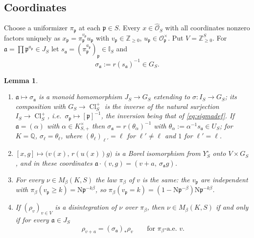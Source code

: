 \documentclass[11pt]{amsart}
\numberwithin{equation}{section}
\newtheorem{lemma}[theorem]{Lemma}
\theoremstyle{definition}
\theoremstyle{remark}
\newcommand{\Z}{\mathbb{Z}}
\newcommand{\Q}{\mathbb{Q}}
\newcommand{\Cl}{\operatorname{Cl}}
\newcommand{\Ns}{\mathrm{N}}
\newcommand{\cO}{\mathcal{O}}
\newcommand{\Idl}{\mathbb{I}}
\newcommand{\pp}{\mathfrak{p}}
\newcommand{\aaa}{\mathfrak{a}}
\newcommand{\hOS}{\widehat{\cO}_S}
\begin{document}
\subsection{Coordinates}

Choose a uniformizer $\pi_\pp$ at each $\pp\in S$. Every $x\in\hOS$ with all
coordinates nonzero factors uniquely as $x_\pp=\pi_\pp^{v_\pp}u_\pp$ with
$v_\pp\in\Z_{\ge0}$, $u_\pp\in\cO_\pp^\times$. Put $V=\Z_{\ge0}^S$. For
$\aaa=\prod\pp^{a_\pp}\in J_S$ let $s_\aaa=(\pi_\pp^{a_\pp})_\pp\in\Idl_S$ and
\begin{equation}\label{eq:sigmadef}
\sigma_\aaa:=r(s_\aaa)^{-1}\in G_S .
\end{equation}

\begin{lemma}\label{lem:coords}
\begin{enumerate}
\item $\aaa\mapsto\sigma_\aaa$ is a monoid homomorphism $J_S\to G_S$ extending
to $\sigma:I_S\to G_S$; its composition with $G_S\to\Cl^+_S$ is the inverse of the natural
surjection $I_S\to\Cl^+_S$, i.e.\ $\sigma_\pp\mapsto[\pp]^{-1}$, the inversion being that of
\eqref{eq:sigmadef}. If $\aaa=(\alpha)$ with $\alpha\in K^\times_{S,+}$ then
$\sigma_\aaa=r(\theta_\alpha)^{-1}$ with $\theta_\alpha:=\alpha^{-1}s_\aaa\in U_S$; for
$K=\Q$, $\sigma_\ell=\theta_\ell$, where $(\theta_\ell)_{\ell'}=\ell$ for $\ell'\neq\ell$
and $1$ for $\ell'=\ell$.
\item $[x,g]\mapsto\bigl(v(x),\,r(u(x))g\bigr)$ is a Borel isomorphism from
$Y_S^\circ$ onto $V\times G_S$, and in these coordinates
$\aaa\cdot(v,g)=(v+a,\ \sigma_\aaa g)$.
\item For every $\nu\in M_\beta(K,S)$ the law $\pi_\beta$ of $v$ is the same:
the $v_\pp$ are independent with $\pi_\beta(v_\pp\ge k)=\Ns\pp^{-k\beta}$, so
$\pi_\beta(v_\pp=k)=(1-\Ns\pp^{-\beta})\Ns\pp^{-k\beta}$.
\item If $(\rho_v)_{v\in V}$ is a disintegration of $\nu$ over $\pi_\beta$,
then $\nu\in M_\beta(K,S)$ if and only if for every $\aaa\in J_S$
\begin{equation}\label{eq:coc}
\rho_{v+a}=(\sigma_\aaa)_*\rho_v\qquad\text{for }\pi_\beta\text{-a.e.\ }v .
\end{equation}
\end{enumerate}
\end{lemma}
\end{document}
